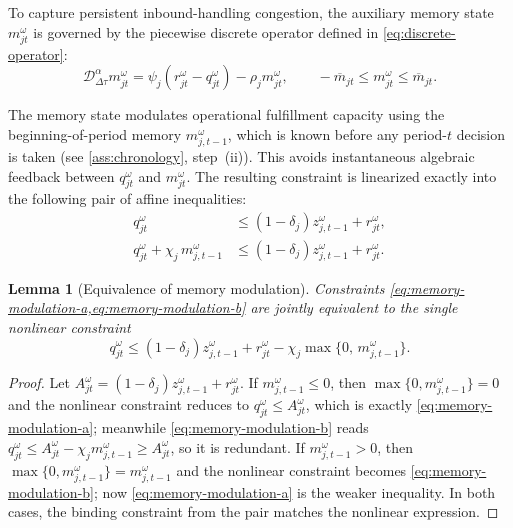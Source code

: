 \documentclass[11pt,a4paper]{article}
\newtheorem{lemma}{Lemma}
\begin{document}
To capture persistent inbound-handling congestion, the auxiliary memory
state \(m_{jt}^{\omega}\) is governed by the piecewise discrete operator
defined in \cref{eq:discrete-operator}:
\begin{equation}
  \mathcal{D}_{\Delta\tau}^{\alpha}m_{jt}^{\omega}
  =
  \psi_j\left(r_{jt}^{\omega}-q_{jt}^{\omega}\right)
  -
  \rho_jm_{jt}^{\omega},
  \qquad
  -\overline m_{jt}\leq m_{jt}^{\omega}\leq\overline m_{jt}.
  \label{eq:discrete-fractional-balance}
\end{equation}

The memory state modulates operational fulfillment capacity using the
beginning-of-period memory \(m_{j,t-1}^{\omega}\), which is known before
any period-\(t\) decision is taken (see
\cref{ass:chronology}, step~(ii)). This avoids instantaneous algebraic
feedback between \(q_{jt}^{\omega}\) and \(m_{jt}^{\omega}\). The
resulting constraint is linearized exactly into the following pair of
affine inequalities:
\begin{subequations}
\label{eq:memory-modulation}
\begin{align}
  q_{jt}^{\omega}
  &\leq
  (1-\delta_j)z_{j,t-1}^{\omega}
  +
  r_{jt}^{\omega},
  \label{eq:memory-modulation-a}\\
  q_{jt}^{\omega}
  +
  \chi_j\,m_{j,t-1}^{\omega}
  &\leq
  (1-\delta_j)z_{j,t-1}^{\omega}
  +
  r_{jt}^{\omega}.
  \label{eq:memory-modulation-b}
\end{align}
\end{subequations}

\begin{lemma}[Equivalence of memory modulation]
\label{lem:max-linearization}
Constraints \cref{eq:memory-modulation-a,eq:memory-modulation-b} are
jointly equivalent to the single nonlinear constraint
\[
  q_{jt}^{\omega}
  \leq
  (1-\delta_j)z_{j,t-1}^{\omega}
  +
  r_{jt}^{\omega}
  -
  \chi_j\max\{0,\,m_{j,t-1}^{\omega}\}.
\]
\end{lemma}

\begin{proof}
Let \(A_{jt}^{\omega}=(1-\delta_j)z_{j,t-1}^{\omega}+r_{jt}^{\omega}\).
If \(m_{j,t-1}^{\omega}\leq 0\), then
\(\max\{0,m_{j,t-1}^{\omega}\}=0\) and the nonlinear constraint reduces
to \(q_{jt}^{\omega}\leq A_{jt}^{\omega}\), which is exactly
\cref{eq:memory-modulation-a}; meanwhile
\cref{eq:memory-modulation-b} reads
\(q_{jt}^{\omega}\leq A_{jt}^{\omega}-\chi_jm_{j,t-1}^{\omega}\geq
A_{jt}^{\omega}\), so it is redundant.
If \(m_{j,t-1}^{\omega}>0\), then
\(\max\{0,m_{j,t-1}^{\omega}\}=m_{j,t-1}^{\omega}\) and the nonlinear
constraint becomes \cref{eq:memory-modulation-b}; now
\cref{eq:memory-modulation-a} is the weaker inequality.
In both cases, the binding constraint from the pair matches the
nonlinear expression.
\end{proof}
\end{document}
